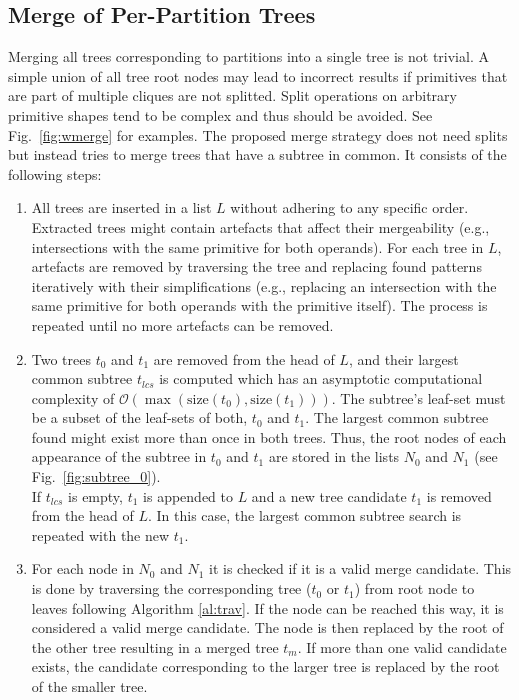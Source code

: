 \subsection{Merge of Per-Partition Trees}
\label{sec:merge}
Merging all trees corresponding to partitions into a single tree is not trivial. 
A simple union of all tree root nodes may lead to incorrect results if primitives that are part of multiple cliques are not splitted.
Split operations on arbitrary primitive shapes tend to be complex and thus should be avoided.
See Fig.~\ref{fig:wmerge} for examples.  
The proposed merge strategy does not need splits but instead tries to merge trees that have a subtree in common.
It consists of the following steps:
\begin{enumerate}
	\item All trees are inserted in a list $L$ without adhering to any specific order.   
	Extracted trees might contain artefacts that affect their mergeability (e.g., intersections with the same primitive for both operands). 
	For each tree in $L$, artefacts are removed by traversing the tree and replacing found patterns iteratively with their simplifications (e.g., replacing an intersection with the same primitive for both operands with the primitive itself). 
	The process is repeated until no more artefacts can be removed.  
	\item Two trees $t_0$ and $t_1$ are removed from the head of $L$, and their largest common subtree $t_{lcs}$ is computed which has an asymptotic computational complexity of $\mathcal{O}(\max(\text{size}(t_0),\text{size}(t_1)))$.
	The subtree's leaf-set must be a subset of the leaf-sets of both, $t_0$ and $t_1$. 
	The largest common subtree found might exist more than once in both trees.
	Thus, the root nodes of each appearance of the subtree in $t_0$ and $t_1$ are stored in the lists $N_0$ and $N_1$ (see Fig.~\ref{fig:subtree_0}).
	\\	
	If $t_{lcs}$ is empty, $t_1$ is appended to $L$ and a new tree candidate $t_1$ is removed from the head of $L$. 
	In this case, the largest common subtree search is repeated with the new $t_1$.
	\item For each node in $N_0$ and $N_1$ it is checked if it is a valid merge candidate.
	This is done by traversing the corresponding tree ($t_0$ or $t_1$) from root node to leaves following Algorithm \ref{al:trav}.
	If the node can be reached this way, it is considered a valid merge candidate.
	The node is then replaced by the root of the other tree resulting in a merged tree $t_m$.
	If more than one valid candidate exists, the candidate corresponding to the larger tree is replaced by the root of the smaller tree.

\end{enumerate}
